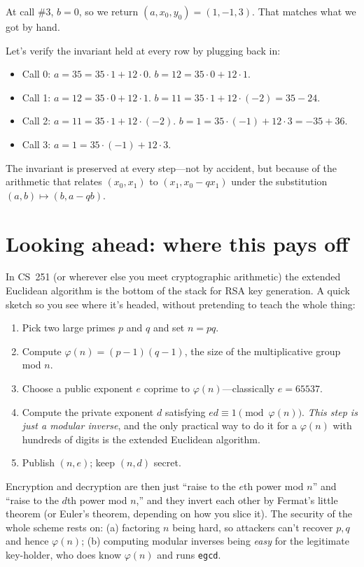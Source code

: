 \documentclass[11pt]{article}
\begin{document}
At call \#3, $b = 0$, so we return $(a, x_0, y_0) = (1, -1, 3)$. That matches what we got by hand.

Let's verify the invariant held at every row by plugging back in:
\begin{itemize}
  \item Call 0: $a = 35 = 35 \cdot 1 + 12 \cdot 0$. \checkmark \quad $b = 12 = 35 \cdot 0 + 12 \cdot 1$. \checkmark
  \item Call 1: $a = 12 = 35 \cdot 0 + 12 \cdot 1$. \checkmark \quad $b = 11 = 35 \cdot 1 + 12 \cdot (-2) = 35 - 24$. \checkmark
  \item Call 2: $a = 11 = 35 \cdot 1 + 12 \cdot (-2)$. \checkmark \quad $b = 1 = 35 \cdot (-1) + 12 \cdot 3 = -35 + 36$. \checkmark
  \item Call 3: $a = 1 = 35 \cdot (-1) + 12 \cdot 3$. \checkmark
\end{itemize}
The invariant is preserved at every step---not by accident, but because of the arithmetic that relates $(x_0, x_1)$ to $(x_1, x_0 - q x_1)$ under the substitution $(a, b) \mapsto (b, a - q b)$.

\section{Looking ahead: where this pays off}

In CS~251 (or wherever else you meet cryptographic arithmetic) the extended Euclidean algorithm is the bottom of the stack for RSA key generation. A quick sketch so you see where it's headed, without pretending to teach the whole thing:

\begin{enumerate}
  \item Pick two large primes $p$ and $q$ and set $n = p q$.
  \item Compute $\varphi(n) = (p-1)(q-1)$, the size of the multiplicative group mod $n$.
  \item Choose a public exponent $e$ coprime to $\varphi(n)$---classically $e = 65537$.
  \item Compute the private exponent $d$ satisfying $e d \equiv 1 \pmod{\varphi(n)}$. \emph{This step is just a modular inverse}, and the only practical way to do it for a $\varphi(n)$ with hundreds of digits is the extended Euclidean algorithm.
  \item Publish $(n, e)$; keep $(n, d)$ secret.
\end{enumerate}

Encryption and decryption are then just ``raise to the $e$th power mod $n$'' and ``raise to the $d$th power mod $n$,'' and they invert each other by Fermat's little theorem (or Euler's theorem, depending on how you slice it). The security of the whole scheme rests on: (a) factoring $n$ being hard, so attackers can't recover $p, q$ and hence $\varphi(n)$; (b) computing modular inverses being \emph{easy} for the legitimate key-holder, who does know $\varphi(n)$ and runs \texttt{egcd}.
\end{document}
